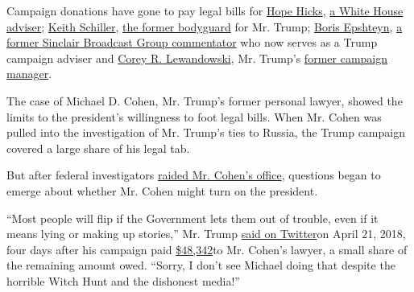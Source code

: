 Campaign donations have gone to pay legal bills for
\href{https://www.justsecurity.org/wp-content/uploads/2019/08/hope-hicks-response-chair-nadler-house-judiciary.pdf}{Hope
Hicks},
\href{https://www.fec.gov/data/disbursements/?data_type=processed\&committee_id=C00003418\&committee_id=C00580100\&recipient_name=TROUT+CACHERIS+\&two_year_transaction_period=2020\&two_year_transaction_period=2018\&two_year_transaction_period=2016}{a
White House adviser};
\href{https://www.dni.gov/files/HPSCI_Transcripts/2019-04-12-KeithS-MTR.pdf}{Keith
Schiller},
\href{https://www.fec.gov/data/disbursements/?data_type=processed\&committee_id=C00580100\&recipient_name=Schertler+Onorato\&two_year_transaction_period=2020\&two_year_transaction_period=2018\&two_year_transaction_period=2016}{the
former bodyguard} for Mr. Trump;
\href{https://www.dni.gov/files/HPSCI_Transcripts/2019-01-16-BorisE-MTR.pdf}{Boris
Epshteyn},
\href{https://www.fec.gov/data/disbursements/?data_type=processed\&committee_id=C00580100\&recipient_name=amolsch\&two_year_transaction_period=2020\&two_year_transaction_period=2018\&two_year_transaction_period=2016}{a
former Sinclair Broadcast Group commentator} who now serves as a Trump
campaign adviser and
\href{https://www.dni.gov/files/HPSCI_Transcripts/2019-03-26-CoreyL1803-MTR.pdf}{Corey
R. Lewandowski}, Mr. Trump's
\href{https://www.fec.gov/data/disbursements/?data_type=processed\&committee_id=C00580100\&recipient_name=mintz+levin\&two_year_transaction_period=2020\&two_year_transaction_period=2018\&two_year_transaction_period=2016}{former
campaign manager}.

The case of Michael D. Cohen, Mr. Trump's former personal lawyer, showed
the limits to the president's willingness to foot legal bills. When Mr.
Cohen was pulled into the investigation of Mr. Trump's ties to Russia,
the Trump campaign covered a large share of his legal tab.

But after federal investigators
\href{https://www.nytimes3xbfgragh.onion/2018/04/09/us/politics/fbi-raids-office-of-trumps-longtime-lawyer-michael-cohen.html}{raided
Mr. Cohen's office}, questions began to emerge about whether Mr. Cohen
might turn on the president.

``Most people will flip if the Government lets them out of trouble, even
if it means lying or making up stories,'' Mr. Trump
\href{https://twitter.com/realdonaldtrump/status/987679852345135105?lang=en}{said
on Twitter}on April 21, 2018, four days after his campaign paid
\href{https://www.fec.gov/data/disbursements/?data_type=processed\&committee_id=C00580100\&recipient_name=McDermott+\&two_year_transaction_period=2020\&two_year_transaction_period=2018\&two_year_transaction_period=2016}{\$48,342}to
Mr. Cohen's lawyer, a small share of the remaining amount owed. ``Sorry,
I don't see Michael doing that despite the horrible Witch Hunt and the
dishonest media!''

